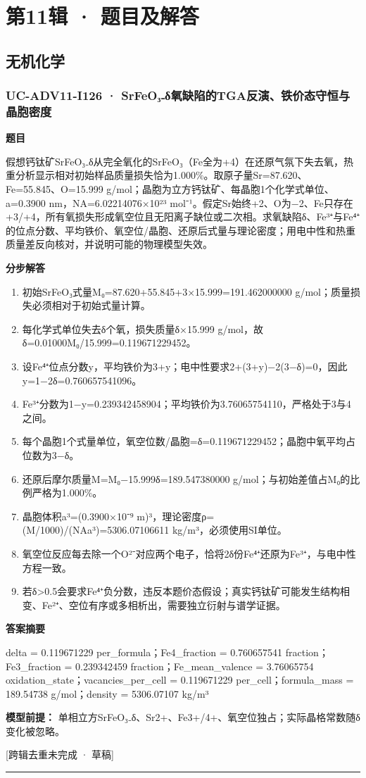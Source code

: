 \documentclass[UTF8,11pt,a4paper]{ctexart}
\begin{document}
\section*{第11辑 · 题目及解答}
\subsection*{无机化学}
\subsubsection*{UC-ADV11-I126 · SrFeO₃₋δ氧缺陷的TGA反演、铁价态守恒与晶胞密度}
\noindent\textbf{题目}\par
假想钙钛矿SrFeO₃₋δ从完全氧化的SrFeO₃（Fe全为+4）在还原气氛下失去氧，热重分析显示相对初始样品质量损失恰为1.000\%。取原子量Sr=87.620、Fe=55.845、O=15.999 g/mol；晶胞为立方钙钛矿、每晶胞1个化学式单位、a=0.3900 nm，NA=6.02214076×10²³ mol⁻¹。假定Sr始终+2、O为−2、Fe只存在+3/+4，所有氧损失形成氧空位且无阳离子缺位或二次相。求氧缺陷δ、Fe³⁺与Fe⁴⁺的位点分数、平均铁价、氧空位/晶胞、还原后式量与理论密度；用电中性和热重质量差反向核对，并说明可能的物理模型失效。\par
\medskip\noindent\textbf{分步解答}
\begin{enumerate}
\item 初始SrFeO₃式量M₀=87.620+55.845+3×15.999=191.462000000 g/mol；质量损失必须相对于初始式量计算。
\item 每化学式单位失去δ个氧，损失质量δ×15.999 g/mol，故δ=0.01000M₀/15.999=0.119671229452。
\item 设Fe⁴⁺位点分数y，平均铁价为3+y；电中性要求2+(3+y)−2(3−δ)=0，因此y=1−2δ=0.760657541096。
\item Fe³⁺分数为1−y=0.239342458904；平均铁价为3.76065754110，严格处于3与4之间。
\item 每个晶胞1个式量单位，氧空位数/晶胞=δ=0.119671229452；晶胞中氧平均占位数为3−δ。
\item 还原后摩尔质量M=M₀−15.999δ=189.547380000 g/mol；与初始差值占M₀的比例严格为1.000\%。
\item 晶胞体积a³=(0.3900×10⁻⁹ m)³，理论密度ρ=(M/1000)/(NAa³)=5306.07106611 kg/m³，必须使用SI单位。
\item 氧空位反应每去除一个O²⁻对应两个电子，恰将2δ份Fe⁴⁺还原为Fe³⁺，与电中性方程一致。
\item 若δ>0.5会要求Fe⁴⁺负分数，违反本题价态假设；真实钙钛矿可能发生结构相变、Fe²⁺、空位有序或多相析出，需要独立衍射与谱学证据。
\end{enumerate}
\noindent\textbf{答案摘要}\par
delta = 0.119671229 per\_formula；Fe4\_fraction = 0.760657541 fraction；Fe3\_fraction = 0.239342459 fraction；Fe\_mean\_valence = 3.76065754 oxidation\_state；vacancies\_per\_cell = 0.119671229 per\_cell；formula\_mass = 189.54738 g/mol；density = 5306.07107 kg/m³\par
\noindent\textbf{模型前提：}
单相立方SrFeO₃₋δ、Sr2+、Fe3+/4+、氧空位独占；实际晶格常数随δ变化被忽略。\par
\noindent\textcolor{red!65!black}{[跨辑去重未完成 · 草稿]} \par
\medskip\hrule\medskip
{}
\end{document}
